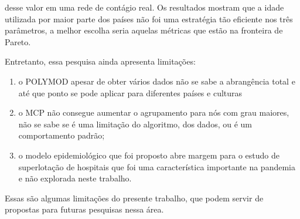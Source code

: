 desse
valor em uma rede de contágio real. Os resultados mostram que a idade utilizada por maior parte dos países não foi uma estratégia tão eficiente nos três parâmetros, a melhor escolha seria aquelas métricas que estão na fronteira de Pareto.
    
Entretanto, essa pesquisa ainda apresenta limitações: 
\begin{enumerate}
    \item o POLYMOD apesar de obter vários dados não se sabe a abrangência total e até que ponto se pode aplicar para diferentes países e culturas
    \item o MCP não consegue aumentar o agrupamento para nós com grau maiores, não se sabe se é uma limitação do algoritmo, dos dados, ou é um comportamento padrão;
    \item o modelo epidemiológico que foi proposto abre margem para o estudo de superlotação de hospitais que foi uma característica importante na pandemia e não explorada neste trabalho.
\end{enumerate}
Essas são algumas limitações do presente trabalho, que podem servir de propostas para futuras pesquisas nessa área.
